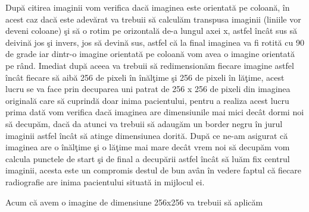 \par

Dup\u{a} citirea imaginii vom verifica dac\u{a} imaginea este orientat\u{a} pe coloan\u{a}, \^{i}n acest caz dac\u{a} este adev\u{a}rat  va trebuii s\u{a} calcul\u{a}m transpusa imaginii (liniile vor deveni coloane) \c{s}i s\u{a} o rotim pe orizontal\u{a} de-a lungul axei x, astfel \^{i}nc\^{a}t sus s\u{a} deivin\u{a} jos \c{s}i invers, jos s\u{a} devin\u{a} sus, astfel c\u{a} la final imaginea va fi rotit\u{a} cu 90 de grade iar dintr-o imagine orientat\u{a} pe coloan\u{a} vom avea o imagine orientat\u{a} pe r\^{a}nd. Imediat dup\u{a} aceea va trebuii s\u{a} redimension\u{a}m fiecare imagine astfel \^{i}nc\^{a}t fiecare s\u{a} aib\u{a} 256 de pixeli \^{i}n \^{i}n\u{a}l\c{t}ime \c{s}i 256 de pixeli \^{i}n l\u{a}\c{t}ime, acest lucru se va face prin decuparea uni patrat de 256 x 256 de pixeli din imaginea original\u{a} care s\u{a} cuprind\u{a} doar inima pacientului, pentru a realiza acest lucru prima dat\u{a} vom verifica dac\u{a} imaginea are dimensiunile mai mici dec\^{a}t dormi noi s\u{a} decup\u{a}m, dac\u{a} da atunci va trebuii s\u{a} adaug\u{a}m un border negru \^{i}n jurul imaginii astfel \^{i}nc\^{a}t s\u{a} atinge dimensiunea dorit\u{a}. Dup\u{a} ce ne-am asigurat c\u{a} imaginea are o \^{i}n\u{a}l\c{t}ime \c{s}i o l\u{a}\c{t}ime mai mare dec\^{a}t vrem noi s\u{a} decup\u{a}m  vom calcula punctele de start \c{s}i de final a decup\u{a}rii astfel \^{i}nc\^{a}t s\u{a} lu\u{a}m fix centrul imaginii, acesta este un compromis destul de bun av\^{a}n \^{i}n vedere faptul c\u{a} fiecare radiografie are inima pacientului situat\u{a} in mijlocul ei.

\par

Acum c\u{a} avem o imagine de dimensiune 256x256 va trebuii s\u{a} aplic\u{a}m